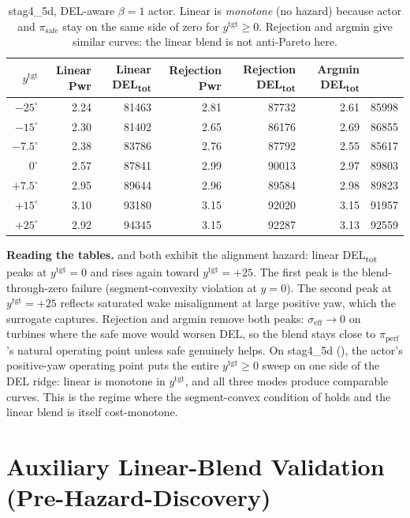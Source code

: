 \documentclass{article}
\begin{document}
\begin{table}[h]
\centering
\caption{stag4\_5d, DEL-aware $\beta=1$ actor. Linear is \emph{monotone} (no hazard) because actor and $\pi_{\mathrm{safe}}$ stay on the same side of zero for $y^{\mathrm{tgt}}\ge 0$. Rejection and argmin give similar curves: the linear blend is not anti-Pareto here.}
\label{tab:sweep_stag4}
\small
\begin{tabular}{rrrrrr}
\toprule
$y^{\mathrm{tgt}}$ & Linear Pwr & Linear DEL\textsubscript{tot} & Rejection Pwr & Rejection DEL\textsubscript{tot} & Argmin DEL\textsubscript{tot} \\
\midrule
$-25^\circ$ & 2.24 & 81463 & 2.81 & 87732 & 2.61 & 85998 \\
$-15^\circ$ & 2.30 & 81402 & 2.65 & 86176 & 2.69 & 86855 \\
$-7.5^\circ$ & 2.38 & 83786 & 2.76 & 87792 & 2.55 & 85617 \\
$0^\circ$ & 2.57 & 87841 & 2.99 & 90013 & 2.97 & 89803 \\
$+7.5^\circ$ & 2.95 & 89644 & 2.96 & 89584 & 2.98 & 89823 \\
$+15^\circ$ & 3.10 & 93180 & 3.15 & 92020 & 3.15 & 91957 \\
$+25^\circ$ & 2.92 & 94345 & 3.15 & 92287 & 3.13 & 92559 \\
\bottomrule
\end{tabular}
\end{table}

\textbf{Reading the tables.}
 and  both exhibit the alignment hazard: linear DEL\textsubscript{tot} peaks at $y^{\mathrm{tgt}}=0$ and rises again toward $y^{\mathrm{tgt}}=+25$.
The first peak is the blend-through-zero failure (segment-convexity violation at $y=0$).
The second peak at $y^{\mathrm{tgt}}=+25$ reflects saturated wake misalignment at large positive yaw, which the surrogate captures.
Rejection and argmin remove both peaks: $\sigma_{\mathrm{eff}}\to 0$ on turbines where the safe move would worsen DEL, so the blend stays close to $\pi_{\mathrm{perf}}$'s natural operating point unless safe genuinely helps.
On stag4\_5d (), the actor's positive-yaw operating point puts the entire $y^{\mathrm{tgt}}\ge 0$ sweep on one side of the DEL ridge: linear is monotone in $y^{\mathrm{tgt}}$, and all three modes produce comparable curves.
This is the regime where the segment-convex condition of  holds and the linear blend is itself cost-monotone.

\section{Auxiliary Linear-Blend Validation (Pre-Hazard-Discovery)}
\label{app:auxiliary}
\end{document}
